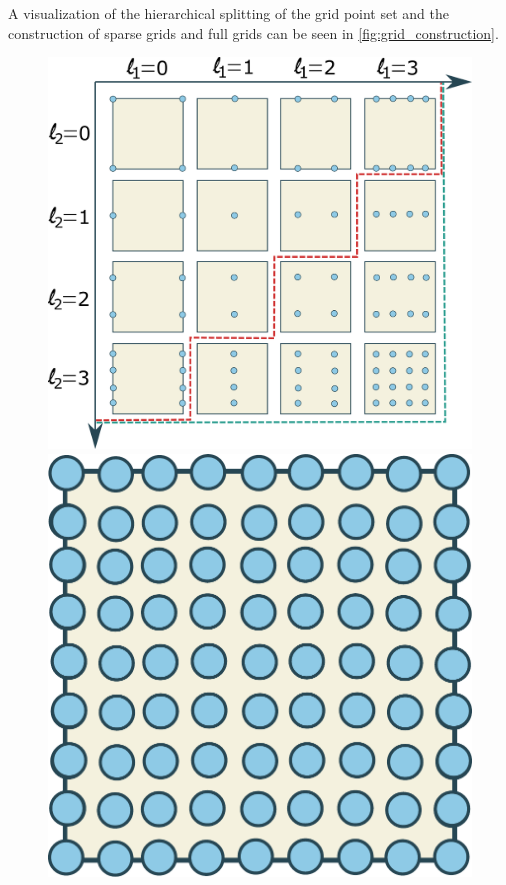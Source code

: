 \documentclass[
  a4paper,  %
  twoside,  %
  bibliography=totoc,
  headsepline,
  cleardoublepage=empty,
  parskip=half,
  draft=false
]{scrbook}
\begin{document}
A visualization of the hierarchical splitting of the grid point set and the construction of sparse grids and full grids can be seen in \cref{fig:grid_construction}.

\newpage
\begin{mdframed}[style=style]
\vspace{2.5mm}
\begin{figure}[H]
        \centering
\begin{minipage}{.73\textwidth}
        \centering
  \includegraphics[width=.8\linewidth]{graphics/grid_subspaces}
    \end{minipage}%
    \begin{minipage}{0.26\textwidth}
        \centering
  \includegraphics[width=.8\linewidth]{graphics/full_grid}

\end{minipage}
\end{figure}
\end{mdframed}
\end{document}
